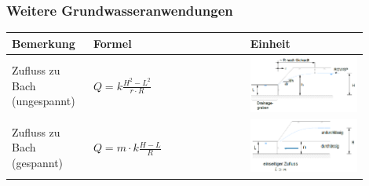 	\begin{minipage}{\linewidth}
		
		\subsubsection{Weitere Grundwasseranwendungen}
		
		\begin{tabular}{p{0.2\linewidth}|p{0.4\linewidth}|p{0.3\linewidth}}
			Bemerkung 		& Formel			&	Einheit \\ \hline
			
			Zufluss zu Bach (ungespannt) & $ Q = k \frac{H^2 - L^2}{r \cdot R} $	& \smallskip \includegraphics[width=\linewidth]{images/GW12Bachungespannt.PNG}  \\ \hline
			
			Zufluss zu Bach (gespannt)	& $ Q = m \cdot k \frac{H - L}{R} $ & \smallskip \includegraphics[width=\linewidth]{images/GW13Bachgespannt.PNG}  \\ \hline
			

\end{tabular}
\end{minipage}
